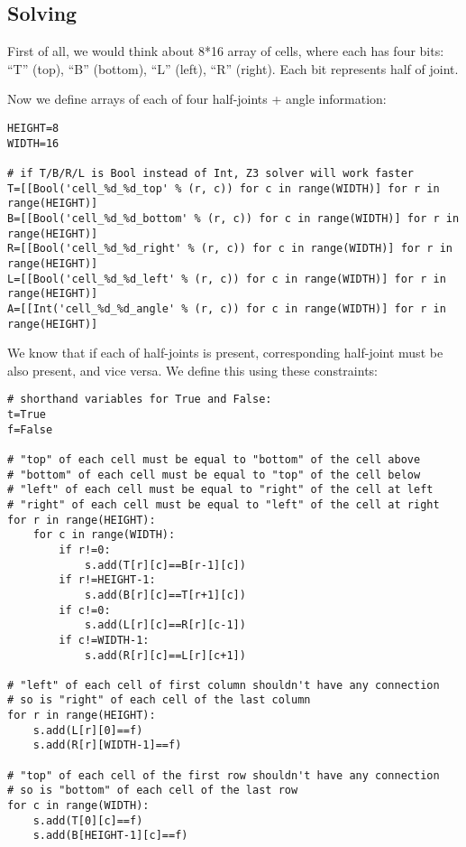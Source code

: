 \subsection{Solving}

First of all, we would think about 8*16 array of cells, where each has four bits:
``T'' (top),
``B'' (bottom),
``L'' (left),
``R'' (right).
Each bit represents half of joint.



Now we define arrays of each of four half-joints + angle information:

\begin{lstlisting}
HEIGHT=8
WIDTH=16

# if T/B/R/L is Bool instead of Int, Z3 solver will work faster
T=[[Bool('cell_%d_%d_top' % (r, c)) for c in range(WIDTH)] for r in range(HEIGHT)]
B=[[Bool('cell_%d_%d_bottom' % (r, c)) for c in range(WIDTH)] for r in range(HEIGHT)]
R=[[Bool('cell_%d_%d_right' % (r, c)) for c in range(WIDTH)] for r in range(HEIGHT)]
L=[[Bool('cell_%d_%d_left' % (r, c)) for c in range(WIDTH)] for r in range(HEIGHT)]
A=[[Int('cell_%d_%d_angle' % (r, c)) for c in range(WIDTH)] for r in range(HEIGHT)]
\end{lstlisting}

We know that if each of half-joints is present, corresponding half-joint must be also present, and vice versa.
We define this using these constraints:

\begin{lstlisting}
# shorthand variables for True and False:
t=True
f=False

# "top" of each cell must be equal to "bottom" of the cell above
# "bottom" of each cell must be equal to "top" of the cell below
# "left" of each cell must be equal to "right" of the cell at left
# "right" of each cell must be equal to "left" of the cell at right
for r in range(HEIGHT):
    for c in range(WIDTH):
        if r!=0:
            s.add(T[r][c]==B[r-1][c])
        if r!=HEIGHT-1:
            s.add(B[r][c]==T[r+1][c])
        if c!=0:
            s.add(L[r][c]==R[r][c-1])
        if c!=WIDTH-1:
            s.add(R[r][c]==L[r][c+1])

# "left" of each cell of first column shouldn't have any connection
# so is "right" of each cell of the last column
for r in range(HEIGHT):
    s.add(L[r][0]==f)
    s.add(R[r][WIDTH-1]==f)

# "top" of each cell of the first row shouldn't have any connection
# so is "bottom" of each cell of the last row
for c in range(WIDTH):
    s.add(T[0][c]==f)
    s.add(B[HEIGHT-1][c]==f)
\end{lstlisting}

